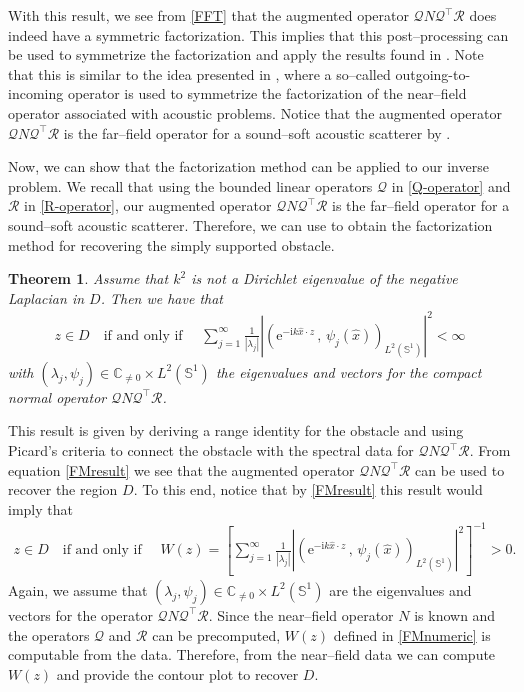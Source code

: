 \documentclass{article}
\newtheorem{theorem}{Theorem}[section]
\newcommand{\C}{\mathbb{C}}
\numberwithin{equation}{section}
\begin{document}
With this result, we see from \eqref{FFT} that the augmented operator $\mathcal{Q} N \mathcal{Q}^\top \mathcal{R}$ does indeed have a symmetric factorization. This implies that this post--processing can be used to symmetrize the factorization and apply the results found in \cite{firstFM,kirschbook}. Note that this is similar to the idea presented in \cite{Hu-nfFM}, where a so--called outgoing-to-incoming operator is used to symmetrize the factorization of the near--field operator associated with acoustic problems. Notice that the augmented operator $\mathcal{Q} N \mathcal{Q}^\top \mathcal{R}$ is the far--field operator for a sound--soft acoustic scatterer by \cite[equation (1.55)]{kirschbook}. 


Now, we can show that the factorization method can be applied to our inverse problem. We recall that using the bounded linear operators $\mathcal{Q}$ in \eqref{Q-operator} and $\mathcal{R}$ in \eqref{R-operator}, our augmented operator $\mathcal{Q} N \mathcal{Q}^\top \mathcal{R}$ is the far--field operator for a sound--soft acoustic scatterer. Therefore, we can use \cite[Theorem 1.25]{kirschbook} to obtain the factorization method for recovering the simply supported obstacle.


\begin{theorem} 
Assume that $k^2$ is not a Dirichlet eigenvalue of the negative Laplacian in $D$. Then we have that 
\begin{align} \label{FMresult}
z \in D \quad \text{if and only if } \quad \sum\limits_{j=1}^{\infty} \frac{1}{|\lambda_j| }  \left| \left( \mathrm{e}^{-\mathrm{i}k\hat{x}\cdot z} \, , \, \psi_j(\hat{x}) \right)_{L^2(\mathbb{S}^1)} \right|^2 < \infty 
\end{align}
with $(\lambda_j , \psi_j) \in \C_{\neq 0} \times L^2(\mathbb{S}^1)$ the eigenvalues and vectors for the compact normal operator $\mathcal{Q} N \mathcal{Q}^\top \mathcal{R}$.
\end{theorem} 


This result is given by deriving a range identity for the obstacle and using Picard's criteria to connect the obstacle with the spectral data for $\mathcal{Q} N \mathcal{Q}^\top \mathcal{R}$. From equation \eqref{FMresult} we see that the augmented operator $\mathcal{Q} N \mathcal{Q}^\top \mathcal{R}$ can be used to recover the region $D$. To this end, notice that by \eqref{FMresult} this result would imply that 
\begin{align} \label{FMnumeric}
z \in D \quad \text{if and only if } \quad W(z) = \left[\sum\limits_{j=1}^{\infty} \frac{1 }{|\lambda_j| }  \left| \left( \mathrm{e}^{-\mathrm{i}k\hat{x}\cdot z} \, , \, \psi_j(\hat{x}) \right)_{L^2(\mathbb{S}^1)} \right|^2 \right]^{-1} >0. 
\end{align}
Again, we assume that $(\lambda_j , \psi_j) \in \C_{\neq 0} \times L^2(\mathbb{S}^1)$ are the eigenvalues and vectors for the operator $\mathcal{Q} N \mathcal{Q}^\top \mathcal{R}$. Since the near--field operator $N$ is known and the operators $\mathcal{Q}$ and $\mathcal{R}$ can be precomputed, $W(z)$ defined in \eqref{FMnumeric} is computable from the data. Therefore, from the near--field data we can compute $W(z)$ and provide the contour plot to recover $D$. 
\end{document}
